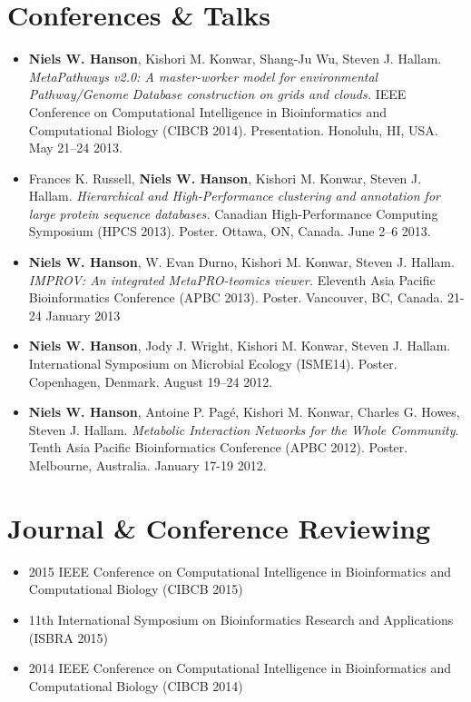 \documentclass[print]{hanson_cv} %
\begin{document}
\section{Conferences \& Talks}
\begin{itemize}
\item
  \textbf{Niels W. Hanson}, Kishori M. Konwar, Shang-Ju Wu, Steven J.
  Hallam. \emph{MetaPathways v2.0: A master-worker model for
  environmental Pathway/Genome Database construction on grids and
  clouds.} IEEE Conference on Computational Intelligence in
  Bioinformatics and Computational Biology (CIBCB 2014). Presentation.
  Honolulu, HI, USA. May 21--24 2013.
\item
  Frances K. Russell, \textbf{Niels W. Hanson}, Kishori M. Konwar,
  Steven J. Hallam. \emph{Hierarchical and High-Performance clustering
  and annotation for large protein sequence databases.} 
  Canadian High-Performance Computing Symposium (HPCS 2013). Poster. Ottawa,
  ON, Canada. June 2--6 2013.
\item
  \textbf{Niels W. Hanson}, W. Evan Durno, Kishori M. Konwar, Steven J.
  Hallam. \emph{IMPROV: An integrated MetaPRO-teomics viewer.} Eleventh Asia Pacific Bioinformatics Conference (APBC 2013). Poster. Vancouver, BC, Canada. 21-24 January 2013
\item \textbf{Niels W. Hanson}, Jody J. Wright, Kishori M. Konwar, Steven J. Hallam. International Symposium on Microbial Ecology (ISME14). Poster. Copenhagen, Denmark. August 19--24 2012.
\item
  \textbf{Niels W. Hanson}, Antoine P. Pag\'{e}, Kishori M. Konwar, Charles
  G. Howes, Steven J. Hallam. \emph{Metabolic Interaction Networks for
  the Whole Community}. Tenth Asia Pacific Bioinformatics Conference (APBC 2012). Poster. Melbourne, Australia. January 17-19 2012.
\end{itemize}

\section{Journal \& Conference Reviewing}
\begin{itemize}
\item 2015 IEEE Conference on Computational Intelligence in Bioinformatics and Computational Biology (CIBCB 2015)
\item 11th International Symposium on Bioinformatics Research and Applications (ISBRA 2015)
\item 2014 IEEE Conference on Computational Intelligence in Bioinformatics and Computational Biology (CIBCB 2014)
\end{itemize}
\end{document}
